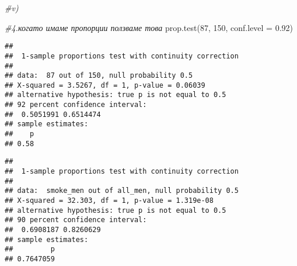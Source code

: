 \documentclass[
]{article}
\newenvironment{Shaded}{\begin{snugshade}}{\end{snugshade}}
\newcommand{\AttributeTok}[1]{\textcolor[rgb]{0.77,0.63,0.00}{#1}}
\newcommand{\CommentTok}[1]{\textcolor[rgb]{0.56,0.35,0.01}{\textit{#1}}}
\newcommand{\DecValTok}[1]{\textcolor[rgb]{0.00,0.00,0.81}{#1}}
\newcommand{\FloatTok}[1]{\textcolor[rgb]{0.00,0.00,0.81}{#1}}
\newcommand{\FunctionTok}[1]{\textcolor[rgb]{0.00,0.00,0.00}{#1}}
\newcommand{\NormalTok}[1]{#1}
\newcommand{\OtherTok}[1]{\textcolor[rgb]{0.56,0.35,0.01}{#1}}
\newcommand{\SpecialCharTok}[1]{\textcolor[rgb]{0.00,0.00,0.00}{#1}}
\newcommand{\StringTok}[1]{\textcolor[rgb]{0.31,0.60,0.02}{#1}}
\begin{document}
\begin{Shaded}
\begin{Highlighting}[]
\CommentTok{\#v)}
\end{Highlighting}
\end{Shaded}

\begin{Shaded}
\begin{Highlighting}[]
\CommentTok{\#4.когато имаме пропорции ползваме това}
\FunctionTok{prop.test}\NormalTok{(}\DecValTok{87}\NormalTok{, }\DecValTok{150}\NormalTok{, }\AttributeTok{conf.level =} \FloatTok{0.92}\NormalTok{)}
\end{Highlighting}
\end{Shaded}

\begin{verbatim}
## 
##  1-sample proportions test with continuity correction
## 
## data:  87 out of 150, null probability 0.5
## X-squared = 3.5267, df = 1, p-value = 0.06039
## alternative hypothesis: true p is not equal to 0.5
## 92 percent confidence interval:
##  0.5051991 0.6514474
## sample estimates:
##    p 
## 0.58
\end{verbatim}

\begin{Shaded}
\end{Shaded}

\begin{verbatim}
## 
##  1-sample proportions test with continuity correction
## 
## data:  smoke_men out of all_men, null probability 0.5
## X-squared = 32.303, df = 1, p-value = 1.319e-08
## alternative hypothesis: true p is not equal to 0.5
## 90 percent confidence interval:
##  0.6908187 0.8260629
## sample estimates:
##         p 
## 0.7647059
\end{verbatim}
\end{document}
